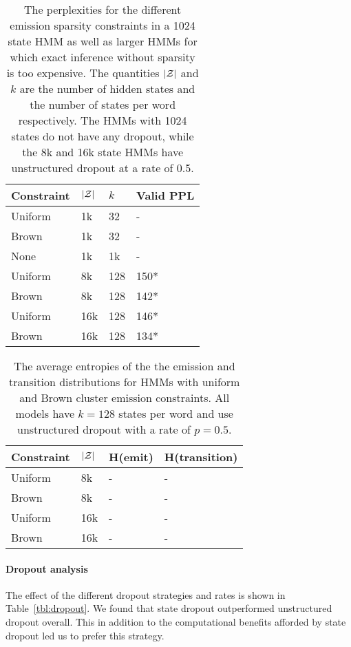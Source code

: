 \documentclass[11pt,a4paper]{article}
\begin{document}
\begin{table}[!t]
\centering
\caption{\label{tbl:ppl-assn-ablation}
The perplexities for the different emission sparsity constraints
in a 1024 state HMM as well as larger HMMs for which exact
inference without sparsity is too expensive.
The quantities $|\mathcal{Z}|$ and $k$ are the number of hidden
states and the number of states per word respectively.
The HMMs with 1024 states do not have any dropout,
while the 8k and 16k state HMMs have unstructured dropout
at a rate of 0.5.
}

\begin{tabular}{llll}
\toprule
Constraint & $|\mathcal{Z}|$ & $k$    & Valid PPL\\
\midrule
Uniform    & 1k       & 32     & -\\
Brown      & 1k       & 32     & -\\
None       & 1k       & 1k     & -\\
\midrule 
Uniform    & 8k       & 128    & 150*\\
Brown      & 8k       & 128    & 142*\\
Uniform    & 16k      & 128    & 146*\\
Brown      & 16k      & 128    & 134*\\
\bottomrule
\end{tabular}
\end{table}

\begin{table}[!t]
\centering
\caption{\label{tbl:entropy}
The average entropies of the the emission and
transition distributions for HMMs
with uniform and Brown cluster emission constraints.
All models have $k=128$ states per word
and use unstructured dropout with a rate of $p=0.5$.
}

\begin{tabular}{llll}
\toprule
Constraint & $|\mathcal{Z}|$ & H(emit)& H(transition)\\
\midrule 
Uniform    & 8k       & -      & - \\
Brown      & 8k       & -      & - \\
Uniform    & 16k      & -      & - \\
Brown      & 16k      & -      & - \\
\bottomrule
\end{tabular}
\end{table}


\paragraph{Dropout analysis}
The effect of the different dropout strategies and rates is 
shown in Table~\ref{tbl:dropout}.
We found that state dropout outperformed unstructured dropout overall.
This in addition to the computational benefits afforded by state dropout
led us to prefer this strategy.
\end{document}
